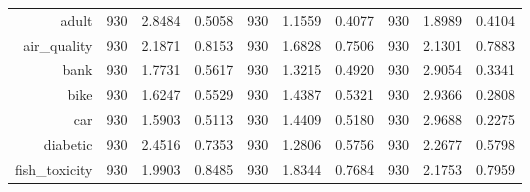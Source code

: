 \begin{table}[htbp]
{\begin{tabular}{rccccccccc}
			adult                               & 930                                & 2.8484                                                                    & 0.5058          & 930            & \cellcolor[rgb]{ .776,  .937,  .808}\textcolor[rgb]{ 0,  .38,  0}{1.1559}          & 0.4077          & 930            & 1.8989          & 0.4104          \\
			air\_quality                        & 930                                & 2.1871                                                                    & 0.8153          & 930            & \cellcolor[rgb]{ .776,  .937,  .808}\textcolor[rgb]{ 0,  .38,  0}{1.6828}          & 0.7506          & 930            & 2.1301          & 0.7883          \\
			bank                                & 930                                & 1.7731                                                                    & 0.5617          & 930            & \cellcolor[rgb]{ .776,  .937,  .808}\textcolor[rgb]{ 0,  .38,  0}{1.3215}          & 0.4920          & 930            & 2.9054          & 0.3341          \\
			bike                                & 930                                & 1.6247                                                                    & 0.5529          & 930            & \cellcolor[rgb]{ .776,  .937,  .808}\textcolor[rgb]{ 0,  .38,  0}{1.4387}          & 0.5321          & 930            & 2.9366          & 0.2808          \\
			car                                 & 930                                & 1.5903                                                                    & 0.5113          & 930            & \cellcolor[rgb]{ .776,  .937,  .808}\textcolor[rgb]{ 0,  .38,  0}{1.4409}          & 0.5180          & 930            & 2.9688          & 0.2275          \\
			diabetic                            & 930                                & 2.4516                                                                    & 0.7353          & 930            & \cellcolor[rgb]{ .776,  .937,  .808}\textcolor[rgb]{ 0,  .38,  0}{1.2806}          & 0.5756          & 930            & 2.2677          & 0.5798          \\
			fish\_toxicity                      & 930                                & 1.9903                                                                    & 0.8485          & 930            & \cellcolor[rgb]{ .776,  .937,  .808}\textcolor[rgb]{ 0,  .38,  0}{1.8344}          & 0.7684          & 930            & 2.1753          & 0.7959          \\

\end{tabular}}
\end{table}
